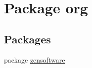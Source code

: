 \hypertarget{namespaceorg}{
\section{Package org}
\label{namespaceorg}
}
\subsection*{Packages}
\begin{DoxyCompactItemize}
\item 
package \hyperlink{namespaceorg_1_1zensoftware}{zensoftware}
\end{DoxyCompactItemize}
